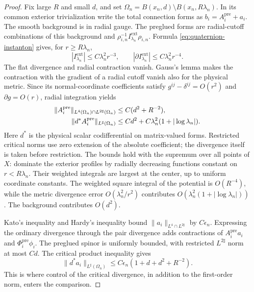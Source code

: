 \documentclass[11pt]{amsart}
\theoremstyle{definition}
\theoremstyle{remark}
\theoremstyle{plain}
\begin{document}
\begin{proof}
Fix large $R$ and small $d$, and set
$\Omega_n=B(x_n,d)\setminus B(x_n,R\lambda_n)$.  In its common exterior
trivialization write the total connection forms as
$b_i=A_i^{\mathrm{pre}}+a_i$.  The smooth background is in radial gauge.
The preglued forms are radial-cutoff combinations of this background
and $\rho_{i,n}^{-1}I^{\mathrm{ext}}_{\lambda_n}\rho_{i,n}$.  Formula
\eqref{eq:quaternion-instanton} gives, for $r\geq R\lambda_n$,
\[
 |I^{\mathrm{ext}}_{\lambda_n}|\leq C\lambda_n^2r^{-3},\qquad
 |\partial I^{\mathrm{ext}}_{\lambda_n}|\leq C\lambda_n^2r^{-4}.
\]
The flat divergence and radial contraction vanish.  Gauss's lemma makes
the contraction with the gradient of a radial cutoff vanish also for the
physical metric.  Since its normal-coordinate coefficients satisfy
$g^{ij}-\delta^{ij}=O(r^2)$ and $\partial g=O(r)$, radial integration yields
\begin{align}\label{eq:frame-annular-coefficients}
 \|A_i^{\mathrm{pre}}\|_{L^4(\Omega_n)\cap L^{2\sharp}(\Omega_n)}
 &\leq C(d^2+R^{-2}),\notag\\
 \|d^*A_i^{\mathrm{pre}}\|_{L^\sharp(\Omega_n)}
 &\leq Cd^2+C\lambda_n^2(1+|\log\lambda_n|).
\end{align}
Here $d^*$ is the physical scalar codifferential on matrix-valued forms.
Restricted critical norms use zero extension of the absolute coefficient;
the divergence itself is taken before restriction.  The bounds hold with
the supremum over all points of $X$: dominate the exterior profiles by
radially decreasing functions constant on $r<R\lambda_n$.  Their weighted
integrals are largest at the center, up to uniform coordinate constants.
The weighted square integral of the potential is $O(R^{-4})$, while
the metric divergence error $O(\lambda_n^2/r^2)$ contributes
$O(\lambda_n^2(1+|\log\lambda_n|))$.  The background contributes $O(d^2)$.

Kato's inequality and Hardy's inequality bound
$\|a_i\|_{L^4\cap L^{2\sharp}}$ by $C\epsilon_n$.  Expressing the
ordinary divergence through the pair divergence adds contractions of
$A_i^{\mathrm{pre}}a_i$ and $\Phi_i^{\mathrm{pre}}\phi_i$.
The preglued spinor is uniformly bounded, with restricted
$L^{2\sharp}$ norm at most $Cd$.  The critical product inequality gives
\begin{equation}\label{eq:frame-error-divergence}
 \|d^*a_i\|_{L^\sharp(\Omega_n)}
 \leq C\epsilon_n(1+d+d^2+R^{-2}).
\end{equation}
This is where control of the critical divergence, in addition to the
first-order norm, enters the comparison.


\end{proof}
\end{document}
